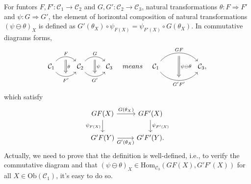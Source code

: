 \documentclass{article}
\begin{document}
\begin{defi}\label{horizontal composition}
	For funtors $F,F':\mathcal{C}_1\to\mathcal{C}_2$ and $G,G':\mathcal{C}_2\to\mathcal{C}_3$, natural transformations $\theta:F\Rightarrow F'$ and $\psi:G\Rightarrow G'$, the element of {\rm horizontal composition} of natural transformations $(\psi\ominus\theta)_X$ is defined as $G'(\theta_X)\circ\psi_{F(X)}=\psi_{F'(X)}\circ G(\theta_X)$. In commutative diagrams forms,
	\[\begin{tikzcd}
			\mathcal{C}_1 \arrow[bend left=50, r, "F", ""' name=F] \arrow[bend right=50, r, "F'"', "" name=F'] &
			\mathcal{C}_2 \arrow[bend left=50, r, "G", ""' name=G] \arrow[bend right=50, r, "G'"', "" name=G'] &
			\arrow[Rightarrow, from=F, to=F', "\theta"] \arrow[Rightarrow, from=G, to=G', "\psi"]\mathcal{C}_3
		\end{tikzcd}\quad{means}\quad\begin{tikzcd}
			\mathcal{C}_1
			\arrow[bend left=50, rr, "GF", ""' name=A]
			\arrow[bend right=50, rr, "G'F'"', "" name=B] & & 
			\arrow[Rightarrow, from=A, to=B, "\psi\ominus\theta"]\mathcal{C}_3,
	\end{tikzcd}\]
	which satisfy
	\begin{equation}\begin{tikzcd}\label{hor}
		GF(X) \arrow[r,"G(\theta_X)"] \arrow[d,"\psi_{F(X)}"'] & GF'(X) \arrow[d,"\psi_{F'(X)}"] \\
		G'F(Y) \arrow[r,"G'(\theta_X)"'] & G'F'(Y).
	\end{tikzcd}\end{equation}
	Actually, we need to prove that the definition is well-defined, i.e., to verify the commutative diagram and that $(\psi\ominus\theta)_X\in\mathrm{Hom}_{\mathcal{C}_3}(GF(X),G'F'(X))$ for all $X\in\mathrm{Ob}(\mathcal{C}_1)$, it's easy to do so.
\end{defi}
\end{document}
